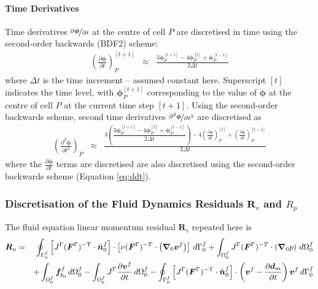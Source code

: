 \documentclass[sn-mathphys,Numbered]{sn-jnl}%
\newcommand{\bb}{\boldsymbol}
\begin{document}
\paragraph{Time Derivatives}
Time derivatives $\nicefrac{\partial \bb{\phi}}{\partial t}$ at the centre of cell $P$ are discretised in time using the second-order backwards (BDF2) scheme:
\begin{eqnarray} \label{eq:ddt}
	\left(\frac{\partial \bb{\phi}}{\partial t}\right)_P^{[t+1]}
		&\approx& \frac{3 \bb{\phi}_P^{[t+1]} - 4 \bb{\phi}_P^{[t]} + \bb{\phi}_P^{[t-1]}}{2\Delta t} 
\end{eqnarray}
where $\Delta t$ is the time increment -- assumed constant here.
Superscript $[t]$ indicates the time level, with $\bb{\phi}_P^{[t+1]}$ corresponding to the value of $\bb{\phi}$ at the centre of cell $P$ at the current time step $[t+1]$.
Using the second-order backwards scheme, second time derivatives $\nicefrac{\partial^2 \bb{\phi}}{\partial t^2}$ are discretised as
\begin{eqnarray}
	\left(\frac{\partial^2 \bb{\phi}}{\partial t^2}\right)_P
	&\approx&
	\frac{3\left( 
		\dfrac{3\bb{\phi}_P^{[t+1]} - 4\bb{\phi}_P^{[t]} + \bb{\phi}_P^{[t-1]}}{2\Delta t} 
		\right) 
	- 4\left(\frac{\partial \bb{\phi}}{\partial t}\right)_P^{[t]} + \left(\frac{\partial \bb{\phi}}{\partial t}\right)_P^{[t-1]}}{2\Delta t}
\end{eqnarray}
where the $\frac{\partial \bb{\phi}}{\partial t}$ terms are discretised are also discretised using the second-order backwards scheme (Equation \ref{eq:ddt}).



\subsubsection[Discretisation of the Fluid Dynamics Residuals]{Discretisation of the Fluid Dynamics Residuals $\bb{R}_v$ and $R_p$}

The fluid equation linear momentum residual $\bb{R}_v$ repeated here is
\begin{eqnarray}
    \bb{R}_u %
    &=&
	\oint_{\Gamma^f_0}  \left[ J^\Gamma (\bb{F}^\Gamma)^{-\text{T}} \cdot \hat{\bb{n}}_0^f \right]
		\cdot \left[\nu (\bb{F}^\Gamma)^{-T} \cdot \left( \bb{\nabla}_0 \bb{v}^f \right) \right] \, d\Gamma^f_0
	+ \int_{\Omega^f_0} J^\Gamma (\bb{F}^\Gamma)^{-T} \cdot \left( \bb{\nabla}_0 p \right) \, d\Omega^f_0 \notag \\
	&&+ \int_{\Omega^f_0} \bb{f}_{b_0}^f \, d\Omega^f_0
	- \int_{\Omega^f_0} J^\Gamma \frac{\partial \bb{v}^f}{\partial t} \, d\Omega^f_0 
	- \oint_{\Gamma^f_0}  \left[ J^\Gamma (\bb{F}^\Gamma)^{-\text{T}} \cdot \hat{\bb{n}}_0^f \right] \cdot \left(\bb{v}^f - \frac{\partial \bb{d}_m}{\partial t}\right) \bb{v}^f \, d\Gamma^f_0
\end{eqnarray}
\end{document}
